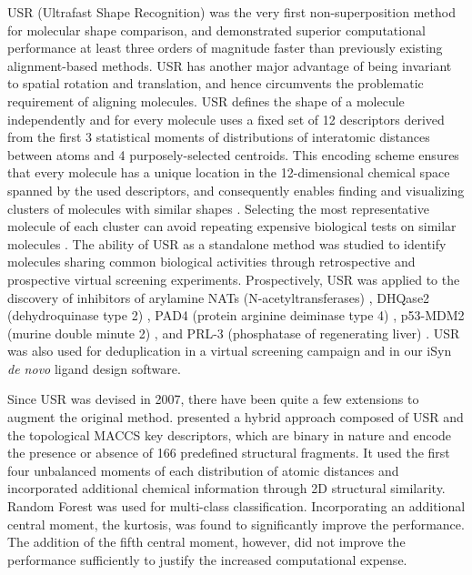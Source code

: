 \documentclass[a4,center,fleqn]{NAR}
\begin{document}
USR (Ultrafast Shape Recognition) \cite{1379} was the very first non-superposition method for molecular shape comparison, and demonstrated superior computational performance at least three orders of magnitude faster than previously existing alignment-based methods. USR has another major advantage of being invariant to spatial rotation and translation, and hence circumvents the problematic requirement of aligning molecules. USR defines the shape of a molecule independently and for every molecule uses a fixed set of 12 descriptors derived from the first 3 statistical moments of distributions of interatomic distances between atoms and 4 purposely-selected centroids. This encoding scheme ensures that every molecule has a unique location in the 12-dimensional chemical space spanned by the used descriptors, and consequently enables finding and visualizing clusters of molecules with similar shapes \cite{1280,1332}. Selecting the most representative molecule of each cluster can avoid repeating expensive biological tests on similar molecules \cite{1280}. The ability of USR as a standalone method was studied to identify molecules sharing common biological activities through retrospective \cite{1332} and prospective \cite{1380,1281,1504,1502,1615} virtual screening experiments. Prospectively, USR was applied to the discovery of inhibitors of arylamine NATs (N-acetyltransferases) \cite{1380}, DHQase2 (dehydroquinase type 2) \cite{1281}, PAD4 (protein arginine deiminase type 4) \cite{1504}, p53-MDM2 (murine double minute 2) \cite{1502}, and PRL-3 (phosphatase of regenerating liver) \cite{1615}. USR was also used for deduplication in a virtual screening campaign \cite{1390} and in our iSyn \cite{1409,1387} \textit{de novo} ligand design software.

Since USR was devised in 2007, there have been quite a few extensions \cite{1333,1436,1437,1334,1335,1337,1338,1331,1407,1408} to augment the original method. \cite{1333} presented a hybrid approach composed of USR and the topological MACCS key descriptors, which are binary in nature and encode the presence or absence of 166 predefined structural fragments. It used the first four unbalanced moments of each distribution of atomic distances and incorporated additional chemical information through 2D structural similarity. Random Forest \cite{1309} was used for multi-class classification. Incorporating an additional central moment, the kurtosis, was found to significantly improve the performance. The addition of the fifth central moment, however, did not improve the performance sufficiently to justify the increased computational expense.
\end{document}

